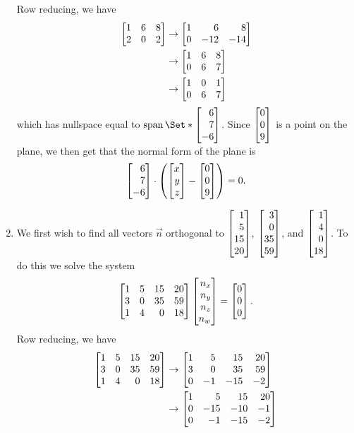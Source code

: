 \begin{exercises}
\begin{problist}
\begin{solution}
\begin{enumerate}
					Row reducing, we have 
					\begin{align*}
						\mat{1&6&8\\2&0&2}&\rightarrow \mat{1&6&8\\0&-12&-14}\\
						&\rightarrow \mat{1&6&8\\0&6&7}\\
						&\rightarrow \mat{1&0&1\\0&6&7}\\
					\end{align*}
					which has nullspace equal to $\Span\Set*{\mat{6\\7\\-6}}$.
					Since $\mat{0\\0\\9}$ is a point on the plane, we then get that the normal form of the plane is \[\mat{6\\7\\-6}\cdot \left(\mat{x\\y\\z}-\mat{0\\0\\9}\right)=0.\]
					\item We first wish to find all vectors $\vec n$ orthogonal to $\mat{1\\5\\15\\20}$, $\mat{3\\0\\35\\59}$, and $\mat{1\\4\\0\\18}$. 
						To do this we solve the system \[\mat{1&5&15&20\\3&0&35&59\\1&4&0&18}\mat{n_x\\n_y\\n_z\\n_w}=\mat{0\\0\\0}.\] 
						Row reducing, we have 
						\begin{align*}
							\mat{1&5&15&20\\3&0&35&59\\1&4&0&18}&\rightarrow \mat{1&5&15&20\\3&0&35&59\\0&-1&-15&-2}\\
							&\rightarrow \mat{1&5&15&20\\0&-15&-10&-1\\0&-1&-15&-2}\\

\end{align*}
\end{enumerate}
\end{solution}
\end{problist}
\end{exercises}
